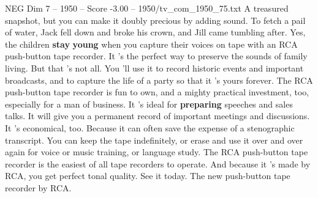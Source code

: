 \begin{textsample}{NEG Dim 7 – 1950 – Score -3.00 – 1950/tv\_com\_1950\_75.txt}  \label{ex:f7_neg_078}
A treasured snapshot, but you can make it doubly precious by adding sound.
To fetch a pail of water, Jack fell down and broke his crown, and Jill came tumbling after.
Yes, the children \textbf{stay} \textbf{young} when you capture their voices on tape with an RCA push-button tape recorder.
It 's the perfect way to preserve the sounds of family living.
But that 's not all.
You 'll use it to record historic events and important broadcasts, and to capture the life of a party so that it 's yours forever.
The RCA push-button tape recorder is fun to own, and a mighty practical investment, too, especially for a man of business.
It 's ideal for \textbf{preparing} speeches and sales talks.
It will give you a permanent record of important meetings and discussions.
It 's economical, too.
Because it can often save the expense of a stenographic transcript.
You can keep the tape indefinitely, or erase and use it over and over again for voice or music training, or language study.
The RCA push-button tape recorder is the easiest of all tape recorders to operate.
And because it 's made by RCA, you get perfect tonal quality.
See it today.
The new push-button tape recorder by RCA.

\end{textsample}
